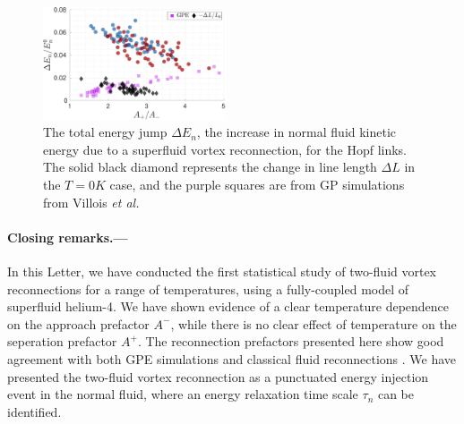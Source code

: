 \documentclass[%
 reprint,
 amsmath,amssymb,
 aps,
 prl,
]{revtex4-2}
\newcommand{\etal}{{\it et al.}~}
\begin{document}
\begin{figure}
	\centering
	\includegraphics*[width=0.48\textwidth]{energy-jump.pdf}
	\caption{The total energy jump $\Delta E_n$, the increase in normal fluid kinetic energy due to a superfluid vortex reconnection, for the Hopf links. The solid black diamond represents the change in line length $\Delta L$ in the $T=0K$ case, and the purple squares are from GP simulations from Villois \etal \cite{villoisIrreversibleDynamicsVortex2020}}
	\label{fig: energy-jumps}
\end{figure}

\paragraph*{Closing remarks.---} In this Letter, we have conducted the first statistical study of two-fluid vortex reconnections for a range of temperatures, using a fully-coupled model of superfluid helium-4. We have shown evidence of a clear temperature dependence on the approach prefactor $A^-$, while there is no clear effect of temperature on the seperation prefactor $A^+$. The reconnection prefactors presented here show good agreement with both GPE simulations \cite{villoisIrreversibleDynamicsVortex2020,allen2014} and classical fluid reconnections \cite{yaoSeparationScalingViscous2020}. We have presented the two-fluid vortex reconnection as a punctuated energy injection event in the normal fluid, where an energy relaxation time scale $\tau_n$ can be identified. 


\end{document}
